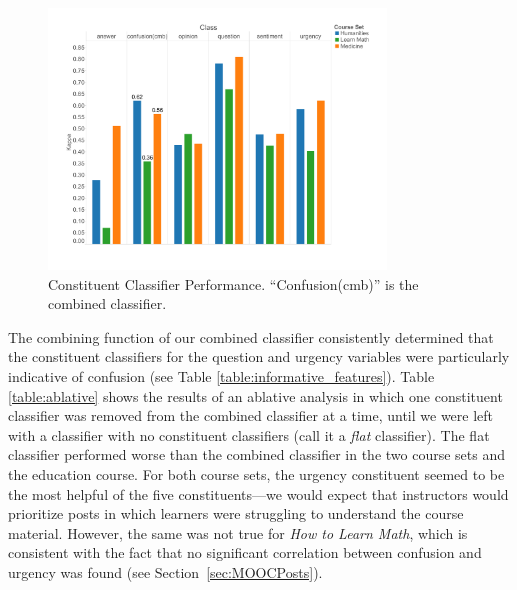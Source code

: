 \documentclass{edm_template}
\begin{document}
\begin{figure}[]
       \centering
       \includegraphics[width=0.8\textwidth]{../Figs/classifierEvalsWithEdu.pdf}
       \caption{\textnormal{Constituent Classifier Performance. ``Confusion(cmb)'' is the combined classifier.}}
      \label{figure:constituents}
\end{figure}

The combining function of our combined classifier consistently determined that the constituent classifiers for the question and urgency variables were particularly indicative of confusion (see Table \ref{table:informative_features}). Table \ref{table:ablative} shows the results of an ablative analysis in which one constituent classifier was removed from the combined classifier at a time, until we were left with a classifier with no constituent classifiers (call it a \emph{flat} classifier). The flat classifier performed worse than the combined classifier in the two course sets and the education course. For both course sets, the urgency constituent seemed to be the most helpful of the five constituents---we would expect that instructors would prioritize posts in which learners were struggling to understand the course material. However, the same was not true for \emph{How to Learn Math}, which is consistent with the fact that no significant correlation between confusion and urgency was found (see Section~\ref{sec:MOOCPosts}).
\end{document}
